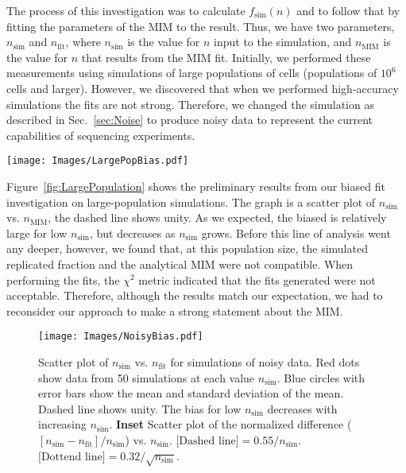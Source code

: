 		The process of this investigation was to calculate $f_\text{sim}(n)$ and to follow that by fitting the parameters of the MIM to the result.
		Thus, we have two parameters, $n_\text{sim}$ and $n_\text{fit}$, where $n_\text{sim}$ is the value for $n$ input to the simulation, and $n_\text{MIM}$ is the value for $n$ that results from the MIM fit.
		Initially, we performed these measurements using simulations of large populations of cells (populations of $10^6$ cells and larger).
		However, we discovered that when we performed high-accuracy simulations the fits are not strong.
		Therefore, we changed the simulation as described in Sec.~\ref{sec:Noise} to produce noisy data to represent the current capabilities of sequencing experiments.
		
		\begin{SCfigure}[1][tbh]
			\texttt{[image: Images/LargePopBias.pdf]}
			\caption[Bias in MIM fit on Large-Population Simulations]{\label{fig:LargePopulation} Scatter plot of $n_\text{sim}$ vs. $n_\text{fit}$ for simulations of a large population.
			Red circles show the data, dashed line shows unity.
			There is a large bias for low $n_\text{sim}$ which decreases as $n_\text{sim}$ grows.
			}
		\end{SCfigure}
		
		Figure~\ref{fig:LargePopulation} shows the preliminary results from our biased fit investigation on large-population simulations.
		The graph is a scatter plot of $n_\text{sim}$ vs. $n_\text{MIM}$, the dashed line shows unity.
		As we expected, the biased is relatively large for low $n_\text{sim}$, but decreases as $n_\text{sim}$ grows.
		Before this line of analysis went any deeper, however, we found that, at this population size, the simulated replicated fraction and the analytical MIM were not compatible.
		When performing the fits, the $\chi^2$ metric indicated that the fits generated were not acceptable.
		Therefore, although the results match our expectation, we had to reconsider our approach to make a strong statement about the MIM.
		
		\begin{figure}[tbh]
			\begin{center}
				\texttt{[image: Images/NoisyBias.pdf]}
			\end{center}
				\caption[Bias in MIM fit on Noisy Data]{\label{fig:NoisyBias} Scatter plot of $n_\text{sim}$ vs. $n_\text{fit}$ for simulations of noisy data.
				Red dots show data from 50 simulations at each value $n_\text{sim}$.
				Blue circles with error bars show the mean and standard deviation of the mean.
				Dashed line shows unity.
				The bias for low $n_\text{sim}$ decreases with increasing $n_\text{sim}$.
				\textbf{Inset} Scatter plot of the normalized difference ($[n_\text{sim} - n_\text{fit}]/n_\text{sim}$) vs. $n_\text{sim}$.
				$\text{[Dashed line]} = 0.55/n_\text{sim}$.
				$\text{[Dottend line]} = 0.32/\sqrt{n_\text{sim}}$.
				}
		\end{figure}
		
